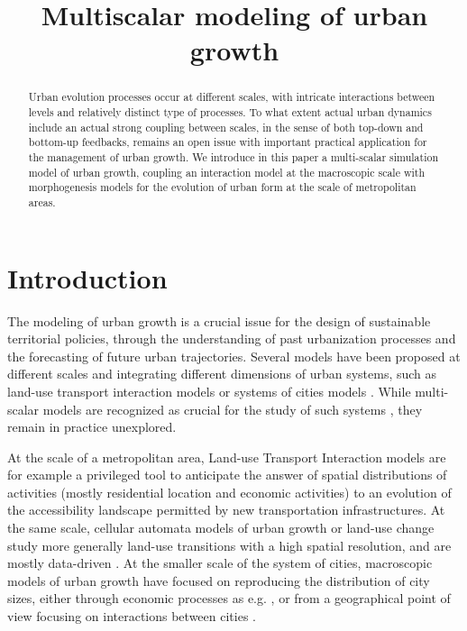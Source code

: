 \documentclass[11pt]{article}
\title{Multiscalar modeling of urban growth}
\date{}
\begin{document}
\maketitle


\begin{abstract}
	Urban evolution processes occur at different scales, with intricate interactions between levels and relatively distinct type of processes. To what extent actual urban dynamics include an actual strong coupling between scales, in the sense of both top-down and bottom-up feedbacks, remains an open issue with important practical application for the management of urban growth. We introduce in this paper a multi-scalar simulation model of urban growth, coupling an interaction model at the macroscopic scale with morphogenesis models for the evolution of urban form at the scale of metropolitan areas.
\end{abstract}





\cite{louail2010comparer}




\section{Introduction}

The modeling of urban growth is a crucial issue for the design of sustainable territorial policies, through the understanding of past urbanization processes and the forecasting of future urban trajectories. Several models have been proposed at different scales and integrating different dimensions of urban systems, such as land-use transport interaction models \cite{wegener2004land} or systems of cities models \cite{pumain2017urban}. While multi-scalar models are recognized as crucial for the study of such systems \cite{Rozenblat2018}, they remain in practice unexplored.

At the scale of a metropolitan area, Land-use Transport Interaction models \cite{wegener2004land} are for example a privileged tool to anticipate the answer of spatial distributions of activities (mostly residential location and economic activities) to an evolution of the accessibility landscape permitted by new transportation infrastructures. At the same scale, cellular automata models of urban growth or land-use change study more generally land-use transitions with a high spatial resolution, and are mostly data-driven \cite{clarke2007decade}. At the smaller scale of the system of cities, macroscopic models of urban growth have focused on reproducing the distribution of city sizes, either through economic processes as e.g. \cite{gabaix1999zipf}, or from a geographical point of view focusing on interactions between cities \cite{favaro2011gibrat}.
\end{document}
